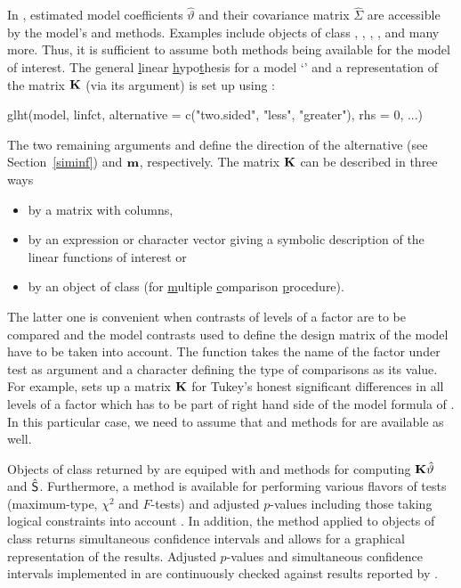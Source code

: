 \documentclass[12pt]{article}
\begin{document}
In \RR, estimated model coefficients $\hat{\vartheta}$ and their covariance 
matrix $\hat{\Sigma}$ are accessible by the model's  
and  methods. Examples include objects of class ,
, , ,  and many more.
Thus, it is sufficient to assume both
methods being available for the model of interest. The \underline{g}eneral
\underline{l}inear \underline{h}ypo\underline{t}hesis for a model 
`' and a representation of the matrix $\K$ (via its
 argument)
is set up using :
\begin{Sinput}
glht(model, linfct, alternative = c("two.sided", "less", "greater"), 
     rhs = 0, ...)
\end{Sinput}
The two remaining arguments
 and  define the direction
of the alternative (see Section~\ref{siminf}) and $\m$, respectively.
The matrix $\K$ can be described in three ways
\begin{itemize}
\item by a matrix with  columns,
\item by an expression or character vector giving a symbolic description 
      of the linear functions of interest or
\item by an object of class  
      (for \underline{m}ultiple \underline{c}omparison \underline{p}rocedure).
\end{itemize}
The latter one is convenient when contrasts of levels of a factor are
to be compared and the model contrasts used to define the design matrix
of the model have to be taken into account. The  function
takes the name of the factor under test as argument and a character 
defining the type of comparisons as its value. For example,
 sets up a matrix $\K$ for Tukey's honest
significant differences in all levels of a factor 
which has to be part of right hand side of the model formula
of . In this particular case, we need to assume
that  and  methods for 
 are available as well. 

Objects of class  returned by  are equiped with
 and  methods for computing
$\K \hat{\vartheta}$ and $\hat{\S}$. Furthermore, a  method
is available for performing various flavors of tests (maximum-type, $\chi^2$ and 
$F$-tests) and adjusted $p$-values including those taking 
logical constraints into account \citep{Shaffer1986, Westfall1997}.
In addition, the  method applied to objects of class 
 returns simultaneous confidence intervals and allows
for a graphical representation of the results. Adjusted $p$-values and
simultaneous confidence intervals implemented in 
are continuously checked against results reported by
\cite{Westfall1999}.
\end{document}
